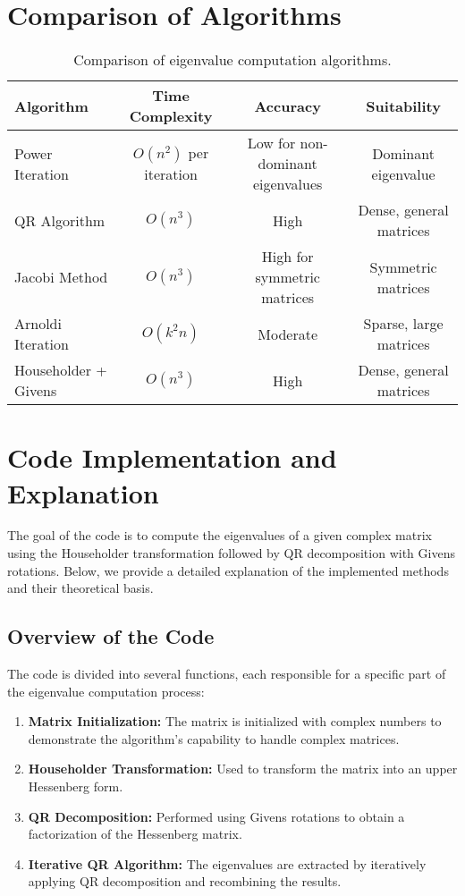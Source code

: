 \documentclass[12pt]{article}
\begin{document}
\section*{Comparison of Algorithms}
\begin{table}[h!]
\centering
\begin{tabular}{|l|c|c|c|}
\hline
\textbf{Algorithm} & \textbf{Time Complexity} & \textbf{Accuracy} & \textbf{Suitability} \\ \hline
    Power Iteration & \( O(n^2) \) per iteration & Low for non-dominant eigenvalues & Dominant eigenvalue \\ \hline
QR Algorithm & \( O(n^3) \) & High & Dense, general matrices \\ \hline
Jacobi Method & \( O(n^3) \) & High for symmetric matrices & Symmetric matrices \\ \hline
Arnoldi Iteration & \( O(k^2 n) \) & Moderate & Sparse, large matrices \\ \hline
Householder + Givens & \( O(n^3) \) & High & Dense, general matrices \\ \hline
\end{tabular}
\caption{Comparison of eigenvalue computation algorithms.}
\end{table}
\section{Code Implementation and Explanation}

The goal of the code is to compute the eigenvalues of a given complex matrix using the Householder transformation followed by QR decomposition with Givens rotations. Below, we provide a detailed explanation of the implemented methods and their theoretical basis.

\subsection{Overview of the Code}

The code is divided into several functions, each responsible for a specific part of the eigenvalue computation process:
\begin{enumerate}
    \item \textbf{Matrix Initialization:} The matrix is initialized with complex numbers to demonstrate the algorithm's capability to handle complex matrices.
    \item \textbf{Householder Transformation:} Used to transform the matrix into an upper Hessenberg form.
    \item \textbf{QR Decomposition:} Performed using Givens rotations to obtain a factorization of the Hessenberg matrix.
    \item \textbf{Iterative QR Algorithm:} The eigenvalues are extracted by iteratively applying QR decomposition and recombining the results.
\end{enumerate}
\end{document}
